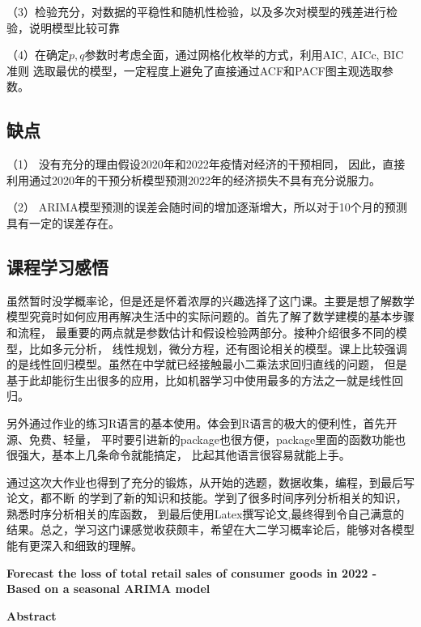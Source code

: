 \documentclass[12pt,a4paper]{nmmcm}
\begin{document}
  （3）检验充分，对数据的平稳性和随机性检验，以及多次对模型的残差进行检验，说明模型比较可靠

  （4）在确定\(p,q\)参数时考虑全面，通过网格化枚举的方式，利用AIC, AICc, BIC准则 
  选取最优的模型，一定程度上避免了直接通过ACF和PACF图主观选取参数。

  \subsection{缺点}
  （1） 没有充分的理由假设2020年和2022年疫情对经济的干预相同，
  因此，直接利用通过2020年的干预分析模型预测2022年的经济损失不具有充分说服力。

  （2） ARIMA模型预测的误差会随时间的增加逐渐增大，所以对于10个月的预测
  具有一定的误差存在。
\subsection*{课程学习感悟}
  虽然暂时没学概率论，但是还是怀着浓厚的兴趣选择了这门课。主要是想了解数学
  模型究竟时如何应用再解决生活中的实际问题的。首先了解了数学建模的基本步骤和流程，
  最重要的两点就是参数估计和假设检验两部分。接种介绍很多不同的模型，比如多元分析，
  线性规划，微分方程，还有图论相关的模型。课上比较强调的是线性回归模型。虽然在中学就已经接触最小二乘法求回归直线的问题，
  但是基于此却能衍生出很多的应用，比如机器学习中使用最多的方法之一就是线性回归。
  
  另外通过作业的练习R语言的基本使用。体会到R语言的极大的便利性，首先开源、免费、轻量，
  平时要引进新的package也很方便，package里面的函数功能也很强大，基本上几条命令就能搞定，
  比起其他语言很容易就能上手。

  通过这次大作业也得到了充分的锻炼，从开始的选题，数据收集，编程，到最后写论文，都不断
  的学到了新的知识和技能。学到了很多时间序列分析相关的知识，熟悉时序分析相关的库函数，
  到最后使用Latex撰写论文,最终得到令自己满意的结果。总之，学习这门课感觉收获颇丰，希望在大二学习概率论后，能够对各模型能有更深入和细致的理解。



\newpage




\newpage
  \begin{center}
    \large{\textbf{Forecast the loss of total retail sales of consumer goods in 2022
     - Based on a seasonal ARIMA model}}


    \textbf{Abstract}
  \end{center}
  

\newpage
\end{document}
